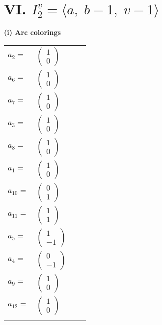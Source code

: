 \documentclass[1p]{elsarticle_modified}
\theoremstyle{definition}
\begin{document}
\centering \section*{VI. $I^v_{2}= \langle a,\;b-1,\;v-1 \rangle$}
\flushleft \textbf{(i) Arc colorings}\\
\begin{tabular}{m{7pt} m{180pt} m{7pt} m{180pt} }
\flushright $a_{2}=$&$\begin{pmatrix}1\\0\end{pmatrix}$ \\
\flushright $a_{6}=$&$\begin{pmatrix}1\\0\end{pmatrix}$ \\
\flushright $a_{7}=$&$\begin{pmatrix}1\\0\end{pmatrix}$ \\
\flushright $a_{3}=$&$\begin{pmatrix}1\\0\end{pmatrix}$ \\
\flushright $a_{8}=$&$\begin{pmatrix}1\\0\end{pmatrix}$ \\
\flushright $a_{1}=$&$\begin{pmatrix}1\\0\end{pmatrix}$ \\
\flushright $a_{10}=$&$\begin{pmatrix}0\\1\end{pmatrix}$ \\
\flushright $a_{11}=$&$\begin{pmatrix}1\\1\end{pmatrix}$ \\
\flushright $a_{5}=$&$\begin{pmatrix}1\\-1\end{pmatrix}$ \\
\flushright $a_{4}=$&$\begin{pmatrix}0\\-1\end{pmatrix}$ \\
\flushright $a_{9}=$&$\begin{pmatrix}1\\0\end{pmatrix}$ \\
\flushright $a_{12}=$&$\begin{pmatrix}1\\0\end{pmatrix}$\\&\end{tabular}
\end{document}
